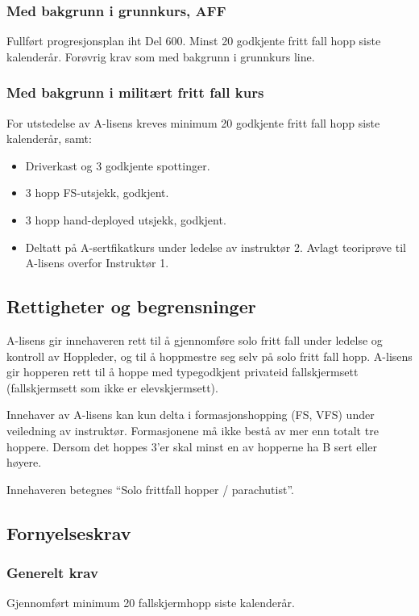 \subsubsection{Med bakgrunn i grunnkurs, AFF}
Fullført progresjonsplan iht Del 600. Minst 20 godkjente fritt fall hopp siste kalenderår. Forøvrig krav som med bakgrunn i grunnkurs line.

\subsubsection{Med bakgrunn i militært fritt fall kurs}
For utstedelse av A-lisens kreves minimum 20 godkjente fritt fall hopp siste kalenderår, samt:

\begin{itemize}
	\item Driverkast og 3 godkjente spottinger.
	\item 3 hopp FS-utsjekk, godkjent.
	\item 3 hopp hand-deployed utsjekk, godkjent.
	\item Deltatt på A-sertfikatkurs under ledelse av instruktør 2. Avlagt teoriprøve til A-lisens overfor Instruktør 1.
\end{itemize}

\subsection{Rettigheter og begrensninger}
A-lisens gir innehaveren rett til å gjennomføre solo fritt fall under ledelse og kontroll av Hoppleder, og til å hoppmestre seg selv på solo fritt fall hopp. A-lisens gir hopperen rett til å hoppe med typegodkjent privateid fallskjermsett (fallskjermsett som ikke er elevskjermsett).

Innehaver av A-lisens kan kun delta i formasjonshopping (FS, VFS) under veiledning av instruktør. Formasjonene må ikke bestå av mer enn totalt tre hoppere. Dersom det hoppes 3'er skal minst en av hopperne ha B sert eller høyere.

Innehaveren betegnes ``Solo frittfall hopper / parachutist''.

\subsection{Fornyelseskrav}
\subsubsection{Generelt krav}
Gjennomført minimum 20 fallskjermhopp siste kalenderår.

